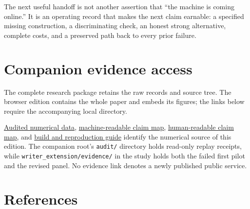 The next useful handoff is not another assertion that ``the machine is
coming online.'' It is an operating record that makes the next claim
earnable: a specified missing construction, a discriminating check, an
honest strong alternative, complete costs, and a preserved path back to
every prior failure.

\section*{Companion evidence access}\label{evidence-access}

The complete research package retains the raw records and source tree.
The browser edition contains the whole paper and embeds its figures; the
links below require the accompanying local directory.

\href{data/audited.json}{Audited numerical data},
\href{claim-map.json}{machine-readable claim map},
\href{claim-map.md}{human-readable claim map}, and
\href{README.md}{build and reproduction guide} identify the numerical
source of this edition. The companion root's \texttt{audit/} directory
holds read-only replay receipts, while
\texttt{writer\_extension/evidence/} in the study holds both the failed
first pilot and the revised panel. No evidence link denotes a newly
published public service.

\section*{References}\label{references}

